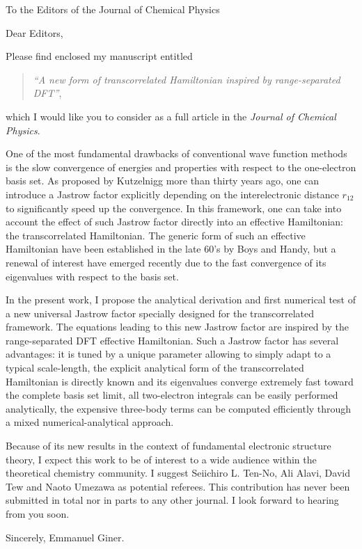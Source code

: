 \documentclass[10pt]{letter}
\begin{document}
\begin{letter}%
{To the Editors of the Journal of Chemical Physics}

\opening{Dear Editors,}

Please find enclosed my manuscript entitled
\begin{quote}
\textit{``A new form of transcorrelated Hamiltonian inspired by range-separated DFT''}, 
\end{quote}
which I would like you to consider as a full article in the \textit{Journal of Chemical Physics}.

One of the most fundamental drawbacks of conventional wave function methods is the slow convergence of energies and properties with respect to the one-electron basis set.
As proposed by Kutzelnigg more than thirty years ago, one can introduce a Jastrow factor explicitly depending on the interelectronic distance $r_{12}$ to significantly speed up the convergence. 
In this framework, one can take into account the effect of such Jastrow factor directly into an effective Hamiltonian: the transcorrelated Hamiltonian. The generic form of such an effective Hamiltonian have been established in the late 60's by Boys and Handy, but a renewal of interest have emerged recently due to the fast convergence of its eigenvalues with respect to the basis set. 

In the present work, I propose the analytical derivation and first numerical test of a new universal Jastrow factor specially designed for the transcorrelated framework. The equations leading to this new Jastrow factor are inspired by the range-separated DFT effective Hamiltonian. Such a Jastrow factor has several advantages: it is tuned by a unique parameter allowing to simply adapt to a typical scale-length, the explicit analytical form of the transcorrelated Hamiltonian is directly known and its eigenvalues converge extremely fast toward the complete basis set limit, all two-electron integrals can be easily performed analytically, the expensive three-body terms can be computed efficiently through a mixed numerical-analytical approach.  

Because of its new results in the context of fundamental electronic structure theory, I expect this work to be of interest to a wide audience within the theoretical chemistry community.  
I suggest Seiichiro L. Ten-No, Ali Alavi, David Tew and Naoto Umezawa as potential referees.
This contribution has never been submitted in total nor in parts to any other journal. 
I look forward to hearing from you soon.

\closing{Sincerely, Emmanuel Giner.}


\end{letter}
\end{document}
